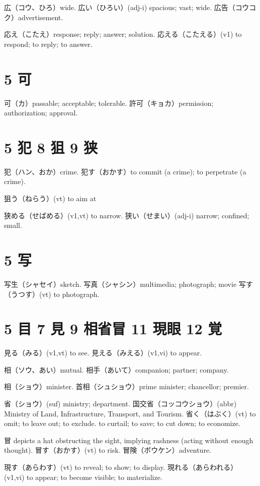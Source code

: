 広（コウ、ひろ）wide.
広い（ひろい）(adj-i) spacious; vast; wide.
広告（コウコク）advertisement.

応え（こたえ）response; reply; answer; solution.
応える（こたえる）(v1) to respond; to reply; to answer.

\section{5 可}

可（カ）passable; acceptable; tolerable.
許可（キョカ）permission; authorization; approval.

\section{5 犯 8 狙 9 狭}

犯（ハン、おか）crime.
犯す（おかす）to commit (a crime); to perpetrate (a crime).

狙う（ねらう）(vt) to aim at

狭める（せばめる）(v1,vt) to narrow.
狭い（せまい）(adj-i) narrow; confined; small.

\section{5 写}

写生（シャセイ）sketch.
写真（シャシン）multimedia; photograph; movie
写す（うつす）(vt) to photograph.

\section{5 目 7 見 9 相省冒 11 現眼 12 覚}

見る（みる）(v1,vt) to see.
見える（みえる）(v1,vi) to appear.

相（ソウ、あい）mutual.
相手（あいて）companion; partner; company.

相（ショウ）minister.
首相（シュショウ）prime minister; chancellor; premier.

省（ショウ）(suf) ministry; department.
国交省（コッコウショウ）(abbr)
Ministry of Land, Infrastructure, Transport, and Tourism.
省く（はぶく）(vt)
to omit; to leave out; to exclude.
to curtail; to save; to cut down; to economize.

冒 depicts a hat obstructing the sight, implying rashness
(acting without enough thought).
冒す（おかす）(vt) to risk.
冒険（ボウケン）adventure.

現す（あらわす）(vt) to reveal; to show; to display.
現れる（あらわれる）(v1,vi) to appear; to become visible; to materialize.

